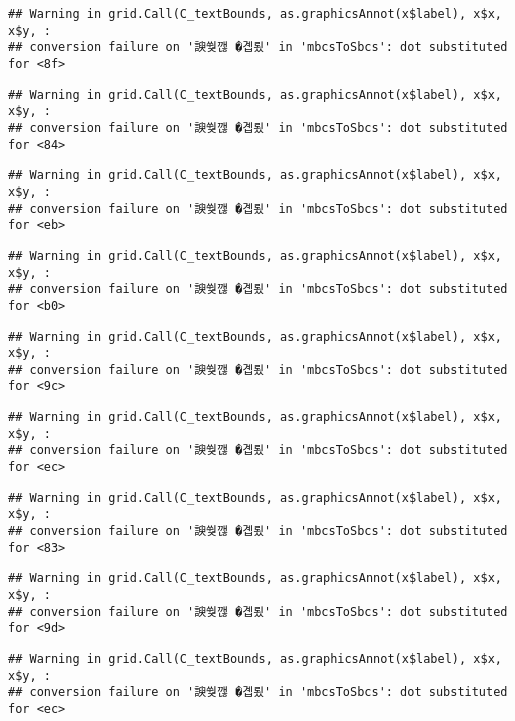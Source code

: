 \documentclass[
]{article}
\begin{document}
\begin{verbatim}
## Warning in grid.Call(C_textBounds, as.graphicsAnnot(x$label), x$x, x$y, :
## conversion failure on '諛쒖깮 �곕룄' in 'mbcsToSbcs': dot substituted for <8f>
\end{verbatim}

\begin{verbatim}
## Warning in grid.Call(C_textBounds, as.graphicsAnnot(x$label), x$x, x$y, :
## conversion failure on '諛쒖깮 �곕룄' in 'mbcsToSbcs': dot substituted for <84>
\end{verbatim}

\begin{verbatim}
## Warning in grid.Call(C_textBounds, as.graphicsAnnot(x$label), x$x, x$y, :
## conversion failure on '諛쒖깮 �곕룄' in 'mbcsToSbcs': dot substituted for <eb>
\end{verbatim}

\begin{verbatim}
## Warning in grid.Call(C_textBounds, as.graphicsAnnot(x$label), x$x, x$y, :
## conversion failure on '諛쒖깮 �곕룄' in 'mbcsToSbcs': dot substituted for <b0>
\end{verbatim}

\begin{verbatim}
## Warning in grid.Call(C_textBounds, as.graphicsAnnot(x$label), x$x, x$y, :
## conversion failure on '諛쒖깮 �곕룄' in 'mbcsToSbcs': dot substituted for <9c>
\end{verbatim}

\begin{verbatim}
## Warning in grid.Call(C_textBounds, as.graphicsAnnot(x$label), x$x, x$y, :
## conversion failure on '諛쒖깮 �곕룄' in 'mbcsToSbcs': dot substituted for <ec>
\end{verbatim}

\begin{verbatim}
## Warning in grid.Call(C_textBounds, as.graphicsAnnot(x$label), x$x, x$y, :
## conversion failure on '諛쒖깮 �곕룄' in 'mbcsToSbcs': dot substituted for <83>
\end{verbatim}

\begin{verbatim}
## Warning in grid.Call(C_textBounds, as.graphicsAnnot(x$label), x$x, x$y, :
## conversion failure on '諛쒖깮 �곕룄' in 'mbcsToSbcs': dot substituted for <9d>
\end{verbatim}

\begin{verbatim}
## Warning in grid.Call(C_textBounds, as.graphicsAnnot(x$label), x$x, x$y, :
## conversion failure on '諛쒖깮 �곕룄' in 'mbcsToSbcs': dot substituted for <ec>
\end{verbatim}
\end{document}
